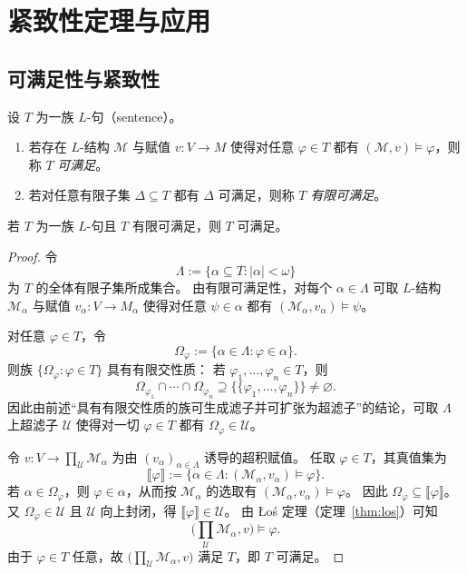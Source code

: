 \documentclass[lang=cn,a4paper,newtx,section]{elegantbook}
\begin{document}
\chapter{紧致性定理与应用}

\section{可满足性与紧致性}

\begin{definition}[可满足与有限可满足]
\label{satisfiable-and-finitely-satisfiable}
设 $T$ 为一族 $L$-句（sentence）。
\begin{enumerate}
  \item 若存在 $L$-结构 $\mathcal M$ 与赋值 $v:V\to M$ 使得对任意 $\varphi\in T$ 都有 $(\mathcal M,v)\models\varphi$，则称 $T$ \emph{可满足}。
  \item 若对任意有限子集 $\Delta\subseteq T$ 都有 $\Delta$ 可满足，则称 $T$ \emph{有限可满足}。
\end{enumerate}
\end{definition}

\begin{theorem}[紧致性定理]
\label{compactness}
若 $T$ 为一族 $L$-句且 $T$ 有限可满足，则 $T$ 可满足。
\end{theorem}

\begin{proof}
令
\[
  \Lambda:=\{\alpha\subseteq T:|\alpha|<\omega\}
\]
为 $T$ 的全体有限子集所成集合。
由有限可满足性，对每个 $\alpha\in\Lambda$ 可取 $L$-结构 $\mathcal M_{\alpha}$ 与赋值 $v_{\alpha}:V\to M_{\alpha}$ 使得对任意 $\psi\in\alpha$ 都有 $(\mathcal M_{\alpha},v_{\alpha})\models\psi$。

对任意 $\varphi\in T$，令
\[
  \Omega_{\varphi}:=\{\alpha\in\Lambda:\varphi\in\alpha\}.
\]
则族 $\{\Omega_{\varphi}:\varphi\in T\}$ 具有有限交性质：
若 $\varphi_1,\dots,\varphi_n\in T$，则
\[
  \Omega_{\varphi_1}\cap\cdots\cap\Omega_{\varphi_n}\supseteq\{\{\varphi_1,\dots,\varphi_n\}\}\neq\varnothing.
\]
因此由前述“具有有限交性质的族可生成滤子并可扩张为超滤子”的结论，可取 $\Lambda$ 上超滤子 $\mathcal U$ 使得对一切 $\varphi\in T$ 都有 $\Omega_{\varphi}\in\mathcal U$。

令 $v:V\to\prod_{\mathcal U}\mathcal M_{\alpha}$ 为由 $(v_{\alpha})_{\alpha\in\Lambda}$ 诱导的超积赋值。
任取 $\varphi\in T$，其真值集为
\[
  \llbracket\varphi\rrbracket:=\{\alpha\in\Lambda:(\mathcal M_{\alpha},v_{\alpha})\models\varphi\}.
\]
若 $\alpha\in\Omega_{\varphi}$，则 $\varphi\in\alpha$，从而按 $\mathcal M_{\alpha}$ 的选取有 $(\mathcal M_{\alpha},v_{\alpha})\models\varphi$。
因此 $\Omega_{\varphi}\subseteq\llbracket\varphi\rrbracket$。
又 $\Omega_{\varphi}\in\mathcal U$ 且 $\mathcal U$ 向上封闭，得 $\llbracket\varphi\rrbracket\in\mathcal U$。
由 Łoś 定理（定理~\ref{thm:los}）可知
\[
  \bigl(\prod_{\mathcal U}\mathcal M_{\alpha},v\bigr)\models\varphi.
\]
由于 $\varphi\in T$ 任意，故 $\bigl(\prod_{\mathcal U}\mathcal M_{\alpha},v\bigr)$ 满足 $T$，即 $T$ 可满足。
\end{proof}
\end{document}
